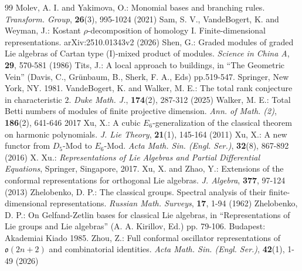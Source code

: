 \documentclass[12pt]{article}
\numberwithin{equation}{section}
\theoremstyle{definition}
\theoremstyle{remark}
\begin{document}
\begin{thebibliography}{99}
	 Molev, A. I. and Yakimova, O.: Monomial bases and branching rules. {\it Transform. Group}, {\bf 26}(3), 995-1024 (2021)
	 Sam, S. V., VandeBogert, K. and Weyman, J.: Kostant $\rho$-decomposition of homology I. Finite-dimensional representations. arXiv:2510.01343v2 (2026)
	 Shen, G.: Graded modules of graded Lie algebras of Cartan type (I)-mixed product of modules. {\it Science in China A}, {\bf 29}, 570-581 (1986)
	 Tits, J.: A local approach to buildings, in ``The Geometric Vein'' (Davis, C., Grünbaum, B., Sherk, F. A., Eds) pp.519-547. Springer, New York, NY. 1981. 
	 VandeBogert, K. and Walker, M. E.: The total rank conjecture in characteristic $2$. {\it Duke Math. J.}, {\bf 174}(2), 287-312 (2025)
	 Walker, M. E.: Total Betti numbers of modules of finite projective dimension. {\it Ann. of Math. (2)}, {\bf 186}(2), 641-646 2017
	 Xu, X.: A cubic $E_6$-generalization of the classical theorem on harmonic polynomials. {\it J. Lie Theory}, {\bf 21}(1), 145-164 (2011)
	 Xu, X.: A new functor from $D_5$-Mod to $E_6$-Mod. {\it Acta Math. Sin. (Engl. Ser.)}, {\bf 32}(8), 867-892 (2016)
	 X. Xu.: {\it Representations of Lie Algebras and Partial Differential Equations}, Springer, Singapore, 
	2017.
	 Xu, X. and Zhao, Y.: Extensions of the conformal representations for orthogonal Lie algebras. {\it J. Algebra}, {\bf 377}, 97-124 (2013)
	 Zhelobenko, D. P.: The classical groups. Spectral analysis of their finite-dimensional representations. {\it Russian Math. Surveys}, {\bf 17}, 1-94 (1962)
	 Zhelobenko, D. P.: On Gelfand-Zetlin bases for classical Lie algebras, in ``Representations of Lie groups and Lie algebras'' (A. A. Kirillov, Ed.) pp. 79-106. Budapest: Akademiai Kiado 1985.
	 Zhou, Z.: Full conformal oscillator representations of $\mathfrak{o}(2n+2)$ and combinatorial identities. {\it Acta Math. Sin. (Engl. Ser.)}, {\bf 42}(1), 1-49 (2026)
\end{thebibliography}
\end{document}
